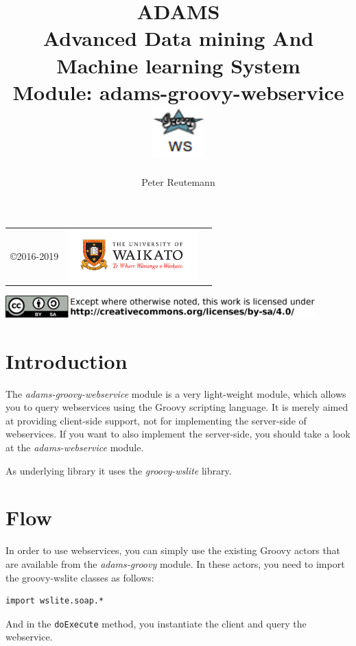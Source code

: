 \documentclass[a4paper]{book}
\title{
  \textbf{ADAMS} \\
  {\Large \textbf{A}dvanced \textbf{D}ata mining \textbf{A}nd \textbf{M}achine
  learning \textbf{S}ystem} \\
  {\Large Module: adams-groovy-webservice} \\
  \vspace{1cm}
  \includegraphics[width=2cm]{images/groovy-webservice-module.png} \\
}
\author{
  Peter Reutemann
}
\begin{document}
\begin{titlepage}
\maketitle

\thispagestyle{empty}
\center
\begin{table}[b]
	\begin{tabular}{c l l}
		\parbox[c][2cm]{2cm}{\copyright 2016-2019} &
		\parbox[c][2cm]{5cm}{\includegraphics[width=5cm]{images/coat_of_arms.pdf}} \\
	\end{tabular}
	\includegraphics[width=12cm]{images/cc.png} \\
\end{table}

\end{titlepage}

\tableofcontents

\chapter{Introduction}
The \textit{adams-groovy-webservice} module is a very light-weight module,
which allows you to query webservices using the Groovy\cite{groovy} scripting
language. It is merely aimed at providing client-side support,
not for implementing the server-side of webservices. If you want to also
implement the server-side, you should take a look at the \textit{adams-webservice}
module.

As underlying library it uses the \textit{groovy-wslite}\cite{groovy-wslite}
library.

\chapter{Flow}

In order to use webservices, you can simply use the existing Groovy actors
that are available from the \textit{adams-groovy} module. In these actors,
you need to import the groovy-wslite classes as follows:
\begin{verbatim}
import wslite.soap.*
\end{verbatim}
And in the \texttt{doExecute} method, you instantiate the client and query the
webservice.
\end{document}
